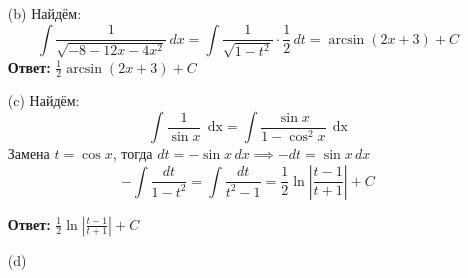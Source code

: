 \documentclass[a4paper]{article}
\renewcommand{\f}[2]{\frac{#1}{#2}}
\newcommand{\dx}{\;\text{dx}}
\begin{document}
\begin{enumerate}
\begin{enumerate}
        \item[(b)]Найдём:
        $$\int \frac{1}{\sqrt{-8 - 12x - 4x^2}} \, dx = \int \frac{1}{\sqrt{1 - t^2}} \cdot \f{1}{2} \, dt
         = \arcsin(2x+3) + C$$
         \textbf{Ответ: } $\f{1}{2} \arcsin(2x+3) + C$

        \item[(c)]Найдём:
        $$\int \frac{1}{\sin x} \, \dx = \int \frac{\sin x}{1 - \cos^2 x} \, \dx$$
        Замена \(t = \cos x\), тогда \(dt = -\sin x \, dx \implies -dt = \sin x \, dx\)
        $$-\int \frac{dt}{1 - t^2} =\int \frac{dt}{t^2-1}= \frac{1}{2} \ln \left| \frac{t-1}{t+1} \right| + C$$

        \textbf{Ответ: } $\frac{1}{2} \ln \left| \frac{t-1}{t+1} \right| + C$\\

        \item[(d)]

    \end{enumerate}
\end{enumerate}
\end{document}
